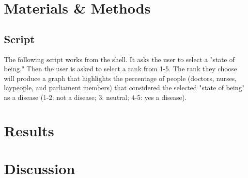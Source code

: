 \documentclass{article}
\begin{document}
\section{Materials \& Methods}
\subsection{Script}
The following script works from the shell. It asks the user to select a "state of being." Then the user is asked to select a rank from 1-5. The rank they choose will produce a graph that highlights the percentage of people (doctors, nurses, laypeople, and parliament members) that considered the selected "state of being" as a disease (1-2: not a disease; 3: neutral; 4-5: yes a disease). 



\section{Results}


\section{Discussion}

\newpage

 
\end{document}
